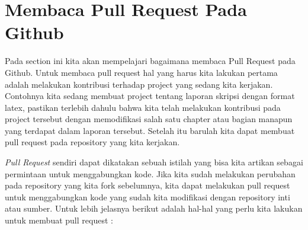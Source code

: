 \section{Membaca Pull Request Pada Github}
Pada section ini kita akan mempelajari bagaimana membaca Pull Request pada Github. Untuk membaca pull request hal yang harus kita lakukan pertama adalah melakukan kontribusi terhadap project yang sedang kita kerjakan. Contohnya kita sedang membuat project tentang laporan skripsi dengan format latex, pastikan terlebih dahulu bahwa kita telah melakukan kontribusi pada project tersebut dengan memodifikasi salah satu chapter atau bagian manapun yang terdapat dalam laporan tersebut. Setelah itu barulah kita dapat membuat pull request pada repository yang kita kerjakan.

\textit{Pull Request} sendiri dapat dikatakan sebuah istilah yang bisa kita artikan sebagai permintaan untuk menggabungkan kode. Jika kita sudah melakukan perubahan pada repository yang kita fork sebelumnya, kita dapat melakukan pull request untuk menggabungkan kode yang sudah kita modifikasi dengan repository inti atau sumber. Untuk lebih jelasnya berikut adalah hal-hal yang perlu kita lakukan untuk membuat pull request :
